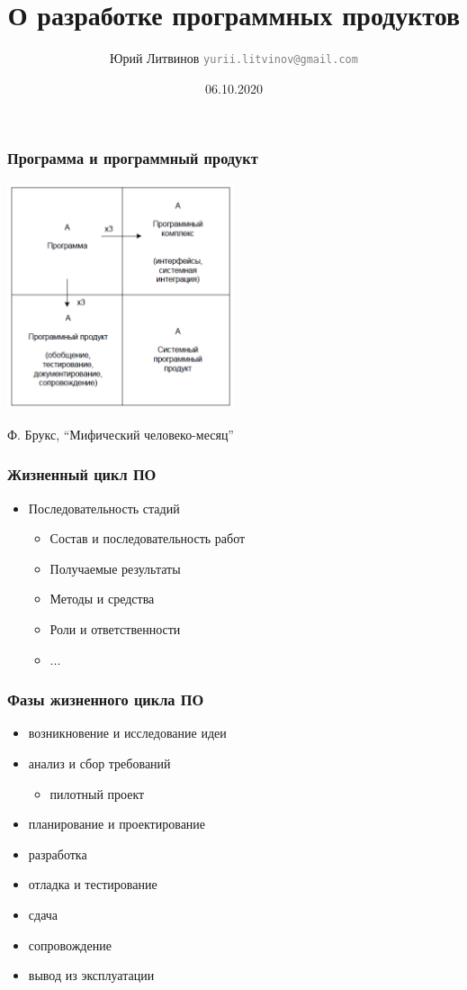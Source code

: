 \documentclass[xetex,mathserif,serif]{beamer}
\title{О разработке программных продуктов}
\author[Юрий Литвинов]{Юрий Литвинов \newline \textcolor{gray}{\small\texttt{yurii.litvinov@gmail.com}}}
\date{06.10.2020}
\begin{document}
	
	\frame{\titlepage}
	
	\begin{frame}
		\frametitle{Программа и программный продукт}
		\begin{center}
			\includegraphics[width=0.5\textwidth]{mythical-man-month.png}
		\end{center}
		\begin{center}
			Ф. Брукс, ``Мифический человеко-месяц''
		\end{center}
	\end{frame}

	\begin{frame}
		\frametitle{Жизненный цикл ПО}
		\begin{itemize}
			\item Последовательность стадий
			\begin{itemize}
				\item Состав и последовательность работ
				\item Получаемые результаты
				\item Методы и средства
				\item Роли и ответственности
				\item ...
			\end{itemize}
		\end{itemize}
	\end{frame}

	\begin{frame}
		\frametitle{Фазы жизненного цикла ПО}
		\begin{itemize}
			\item возникновение и исследование идеи
			\item анализ и сбор требований
			\begin{itemize}
				\item пилотный проект
			\end{itemize}
			\item планирование и проектирование
			\item разработка
			\item отладка и тестирование
			\item сдача
			\item сопровождение
			\item вывод из эксплуатации
		\end{itemize}
	\end{frame}
\end{document}
